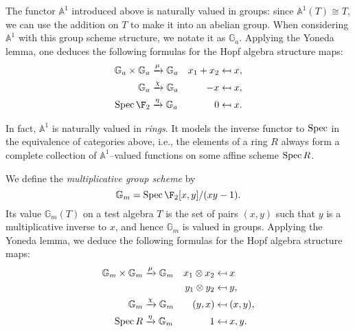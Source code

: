 \begin{example}\label{InformalAdditiveGroupExample}
The functor $\mathbb A^1$ introduced above is naturally valued in groups: since $\mathbb A^1(T) \cong T$, we can use the addition on $T$ to make it into an abelian group.  When considering $\mathbb A^1$ with this group scheme structure, we notate it as $\mathbb G_a$.  Applying the Yoneda lemma, one deduces the following formulas for the Hopf algebra structure maps:
\begin{align*}
\mathbb G_a \times \mathbb G_a & \xrightarrow{\mu} \mathbb G_a & x_1 + x_2 & \mapsfrom x, \\
\mathbb G_a & \xrightarrow{\chi} \mathbb G_a & -x & \mapsfrom x, \\
\Spec \F_2 & \xrightarrow{\eta} \mathbb G_a & 0 & \mapsfrom x.
\end{align*}
\end{example}

\begin{remark}
In fact, $\mathbb A^1$ is naturally valued in \emph{rings}. It models the inverse functor to $\operatorname{Spec}$ in the equivalence of categories above, i.e., the elements of a ring $R$ always form a complete collection of $\mathbb A^1$--valued functions on some affine scheme $\operatorname{Spec} R$.
\end{remark}

\begin{example}
We define the \textit{multiplicative group scheme} by \[\mathbb G_m = \Spec \F_2[x, y] / (xy - 1).\]  Its value $\mathbb G_m(T)$ on a test algebra $T$ is the set of pairs $(x, y)$ such that $y$ is a multiplicative inverse to $x$, and hence $\mathbb G_m$ is valued in groups.  Applying the Yoneda lemma, we deduce the following formulas for the Hopf algebra structure maps:
\begin{align*}
\mathbb G_m \times \mathbb G_m & \xrightarrow{\mu} \mathbb G_m & x_1 \otimes x_2 & \mapsfrom x \\
& & y_1 \otimes y_2 & \mapsfrom y, \\
\mathbb G_m & \xrightarrow{\chi} \mathbb G_m & (y, x) & \mapsfrom (x, y), \\
\operatorname{Spec} R & \xrightarrow{\eta} \mathbb G_m & 1 & \mapsfrom x, y.
\end{align*}
\end{example}

